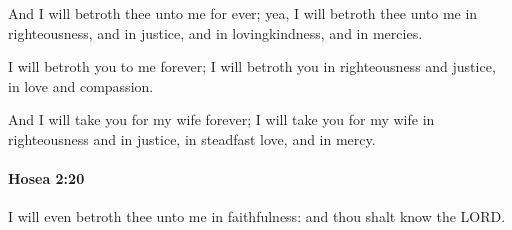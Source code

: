 			\begin{versebox}
					\item[BHS] 
					\item[LXX] 
					\item[ASV] And I will betroth thee unto me for ever; yea, I will betroth thee unto me in righteousness, and in justice, and in lovingkindness, and in mercies.
					\item[NIV] I will betroth you to me forever; I will betroth you in righteousness and justice, in love and compassion.
					\item[NRSV] And I will take you for my wife forever; I will take you for my wife in righteousness and in justice, in steadfast love, and in mercy.
			\end{versebox}

		\paragraph{Hosea 2:20} %
			\label{HOSEA-2-20}

			I will even betroth thee unto me in faithfulness: and thou shalt know the LORD.

